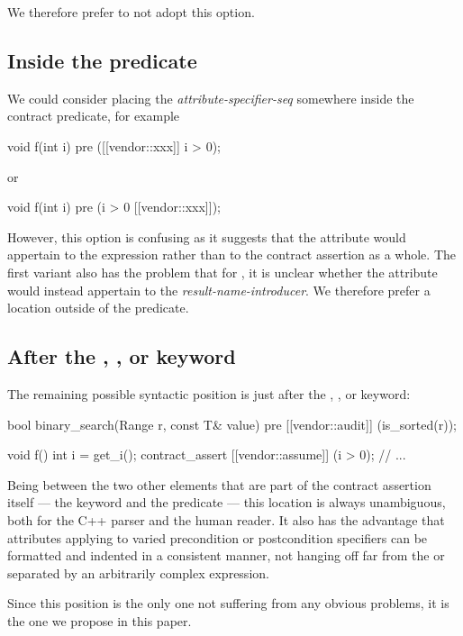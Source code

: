 We therefore prefer to not adopt this option.

\subsection{Inside the predicate}

We could consider placing the  \emph{attribute-specifier-seq} somewhere inside the contract predicate, for example
\begin{codeblock}
void f(int i) 
  pre ([[vendor::xxx]] i > 0);
\end{codeblock}
or
\begin{codeblock}
void f(int i) 
  pre (i > 0 [[vendor::xxx]]);
\end{codeblock}
However, this option is confusing as it suggests that the attribute would appertain to the expression rather than to the contract assertion as a whole. The  first variant also has the problem that for , it is unclear whether the attribute would instead appertain to the \emph{result-name-introducer}. We therefore prefer a location outside of the predicate.

\subsection{After the , , or  keyword}

The remaining possible syntactic position is just after the , , or  keyword:

\begin{codeblock}
bool binary_search(Range r, const T& value)
  pre [[vendor::audit]] (is_sorted(r));
  
void f() {
  int i = get_i();
  contract_assert [[vendor::assume]] (i > 0);
  // ...
}
\end{codeblock}

Being between the two other elements that are part of the contract assertion itself --- the keyword and the predicate --- this location is always unambiguous, both for the C++ parser and the human reader. It also has the advantage that attributes applying to varied precondition or postcondition specifiers can be formatted and indented in a consistent manner, not hanging off far from the  or  separated by an arbitrarily complex expression.

Since this position is the only one not suffering from any obvious problems, it is the one we propose in this paper.

